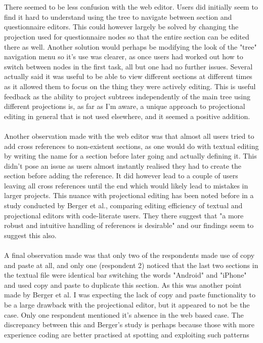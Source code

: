 \documentclass{article}
\begin{document}
\\
\\
There seemed to be less confusion with the web editor. Users did initially seem to find it hard to understand using the tree to navigate between section and questionnaire editors. This could however largely be solved by changing the projection used for questionnaire nodes so that the entire section can be edited there as well. Another solution would perhaps be modifying the look of the "tree" navigation menu so it's use was clearer, as once users had worked out how to switch between nodes in the first task, all but one had no further issues. Several actually said it was useful to be able to view different sections at different times as it allowed them to focus on the thing they were actively editing. This is useful feedback as the ability to project subtrees independently of the main tree using different projections is, as far as I'm aware, a unique approach to projectional editing in general that is not used elsewhere, and it seemed a positive addition.
\\
\\
Another observation made with the web editor was that almost all users tried to add cross references to non-existent sections, as one would do with textual editing by writing the name for a section before later going and actually defining it. This didn't pose an issue as users almost instantly realised they had to create the section before adding the reference. It did however lead to a couple of users leaving all cross references until the end which would likely lead to mistakes in larger projects. This nuance with projectional editing has been noted before in a study conducted by Berger et al.\cite{projEditControlledExperiment}, comparing editing efficiency of textual and projectional editors with code-literate users. They there suggest that "a more robust and intuitive handling of references is desirable" and our findings seem to suggest this also.
\\
\\
A final observation made was that only two of the respondents made use of copy and paste at all, and only one (respondent 2) noticed that the last two sections in the textual file were identical bar switching the words "Android" and "iPhone" and used copy and paste to duplicate this section. As this was another point made by Berger et al.\cite{projEditControlledExperiment} I was expecting the lack of copy and paste functionality to be a large drawback with the projectional editor, but it appeared to not be the case. Only one respondent mentioned it's absence in the web based case. The discrepancy between this and Berger's study is perhaps because those with more experience coding are better practised at spotting and exploiting such patterns 
\end{document}
